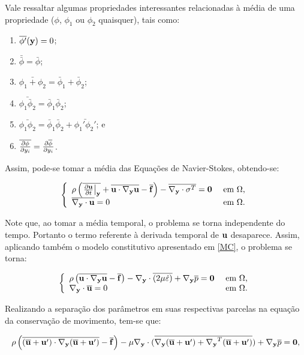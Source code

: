 \documentclass[_ArquivoPrincipal.tex]{subfiles}
\begin{document}
Vale ressaltar algumas propriedades interessantes relacionadas à média de uma propriedade ($\phi$, $\phi_1$ ou $\phi_2$ quaisquer), tais como:

\begin{enumerate}[label=\alph*.]
    \item $\overline{\phi'}(\mathbf{y})=0$;
    \item $\bar{\bar{\phi}}=\bar{\phi}$;
    \item $\bar{\phi_1+\phi_2}=\bar{\phi}_1+\bar{\phi}_2$;
    \item $\bar{\phi_1\bar{\phi}_2}=\bar{\phi}_1\bar{\phi}_2$;
    \item $\bar{\phi_1\phi_2}=\bar{\phi}_1\bar{\phi}_2+\bar{\phi_1'\phi_2'}$; e
    \item $\overline{\frac{\partial{\phi}}{\partial{y_i}}}=\frac{\partial{\overline{\phi}}}{\partial{y_i}}$.
\end{enumerate}

Assim, pode-se tomar a média das Equações de Navier-Stokes, obtendo-se:

\begin{equation}
    \left\{
   \begin{array}{ll}
        \rho\left({\overline{\left.\frac{\partial{\mathbf{u}}}{\partial{t}}\right|_{\mathbf{y}}}+\overline{\mathbf{u}\cdot\mathbf{\nabla_y}\mathbf{u}}-\overline{\mathbf{f}}}\right)-\overline{\mathbf{\nabla_y}\cdot\mathbf{\sigma}^T}=\mathbf{0}&\text{ em }\Omega\text{,}\\
        \overline{\mathbf{\nabla_y}\cdot\mathbf{u}}=0&\text{ em }\Omega\text{.}
    \end{array}
    \right.
\end{equation}

Note que, ao tomar a média temporal, o problema se torna independente do tempo. Portanto o termo referente à derivada temporal de $\mathbf{u}$ desaparece. Assim, aplicando também o modelo constitutivo apresentado em \ref{MC}, o problema se torna:

\begin{equation}
    \left\{
   \begin{array}{ll}
        \rho\left({\overline{\mathbf{u}\cdot\mathbf{\nabla_y}\mathbf{u}}-\overline{\mathbf{f}}}\right)-\mathbf{\nabla_y}\cdot\overline{(2\mu\dot{\mathbf{\varepsilon}})}+\mathbf{\nabla_y}\overline{p}=\mathbf{0}&\text{ em }\Omega\text{,}\\
        \mathbf{\nabla_y}\cdot\overline{\mathbf{u}}=0&\text{ em }\Omega\text{.}
    \end{array}
    \right.
\end{equation}

Realizando a separação dos parâmetros em suas respectivas parcelas na equação da conservação de movimento, tem-se que:

\begin{equation}
    \rho\left({\overline{(\overline{\mathbf{u}}+\mathbf{u}')\cdot\mathbf{\nabla_y}(\overline{\mathbf{u}}+\mathbf{u}')}-\overline{\mathbf{f}}}\right)-
    \mu\mathbf{\nabla_y}\cdot(\overline{\mathbf{\nabla_y}(\overline{\mathbf{u}}+\mathbf{u}')+\mathbf{\nabla_y}^T(\overline{\mathbf{u}}+\mathbf{u}')})+\mathbf{\nabla_y}\overline{p}=\mathbf{0}\text{,}   
\end{equation}
\end{document}
